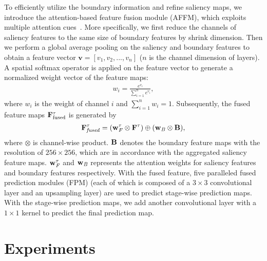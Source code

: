 \documentclass[journal]{IEEEtran}
\begin{document}
To efficiently utilize the boundary information and refine saliency maps, we introduce the attention-based feature fusion module (AFFM), which exploits multiple attention cues~\cite{Chen2017SCA}.
%
More specifically, we first reduce the channels of saliency features to the same size of boundary features by shrink dimension.
%
Then we perform a global average pooling on the saliency and boundary features to obtain a feature vector $\textbf{v}=[v_{1},v_{2},...,v_{n}]$ ($n$ is the channel dimension of layers).
%
A spatial softmax operator is applied on the feature vector to generate a normalized weight vector of the feature maps:
\begin{equation}
\begin{aligned}
{w_{i}}=\frac{e^{v_{i}}}{\sum_{i=1}^{n}e^{v_{i}}},
\label{boundary feature map}
\end{aligned}
\end{equation}
where $w_{i}$ is the weight of channel $i$ and $\sum_{i=1}^{n}w_{i}=1$. Subsequently, the fused feature maps $\bf{F}_{\text{fused}}^{\tau}$ is generated by
\begin{equation}
\begin{aligned}
\bf{F}_{\it{fused}}^{\tau}=(\bf{w}_{\it{F}}^{\tau}\otimes \bf{F}^{\tau}) \oplus (\bf{w}_{\it{B}}\otimes \bf{B}),
\label{equation8}
\end{aligned}
\end{equation}
where $\otimes$ is channel-wise product.
%
$\bf{B}$ denotes the boundary feature maps with the resolution of $256\times256$, which are in accordance with the aggregated saliency feature maps.
%
$\bf{w}_{\it{F}}^{\tau}$ and $\bf{w}_{\it{B}}$ represents the attention weights for saliency features and boundary features respectively.
%
With the fused feature, five paralleled fused prediction modules (FPM) (each of which is composed of a $3\times 3$ convolutional layer and an upsampling layer) are used to predict stage-wise prediction maps.
%
With the stage-wise prediction maps, we add another convolutional layer with a $1\times1$ kernel to predict the final prediction map.
\section{Experiments}
\label{sec:Experiments}
%
\end{document}
